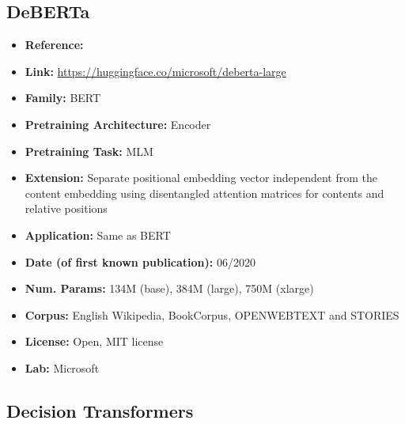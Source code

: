 \documentclass{article}
\begin{document}
\subsection{DeBERTa}
            \begin{itemize}
                \item \textbf{Reference:} 
                \item \textbf{Link:} \url{https://huggingface.co/microsoft/deberta-large}
                \item \textbf{Family:} BERT 
                \item \textbf{Pretraining Architecture:} Encoder
                \item \textbf{Pretraining Task:} MLM
                \item \textbf{Extension:} Separate positional embedding vector independent from the content embedding using disentangled attention matrices for contents and relative positions
                \item \textbf{Application:} Same as BERT
                \item \textbf{Date (of first known publication):} 06/2020
                \item \textbf{Num. Params:} 134M (base), 384M (large), 750M (xlarge)
                \item \textbf{Corpus:} English Wikipedia, BookCorpus, OPENWEBTEXT and STORIES 
                \item \textbf{License:} Open, MIT license
                \item \textbf{Lab:} Microsoft
            \end{itemize}
   
\subsection{Decision Transformers}
\end{document}
